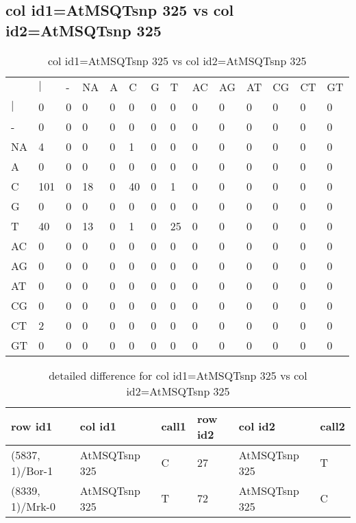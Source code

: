 \subsection{col id1=AtMSQTsnp 325 vs col id2=AtMSQTsnp 325}
\begin{center}
\begin{longtable}{|l|l|l|l|l|l|l|l|l|l|l|l|l|l|}
\caption{col id1=AtMSQTsnp 325 vs col id2=AtMSQTsnp 325} \label{table_dm666}\\
\hline
\\
\hline
&$|$&-&NA&A&C&G&T&AC&AG&AT&CG&CT&GT\\
$|$&0&0&0&0&0&0&0&0&0&0&0&0&0\\
-&0&0&0&0&0&0&0&0&0&0&0&0&0\\
NA&4&0&0&0&1&0&0&0&0&0&0&0&0\\
A&0&0&0&0&0&0&0&0&0&0&0&0&0\\
C&101&0&18&0&40&0&1&0&0&0&0&0&0\\
G&0&0&0&0&0&0&0&0&0&0&0&0&0\\
T&40&0&13&0&1&0&25&0&0&0&0&0&0\\
AC&0&0&0&0&0&0&0&0&0&0&0&0&0\\
AG&0&0&0&0&0&0&0&0&0&0&0&0&0\\
AT&0&0&0&0&0&0&0&0&0&0&0&0&0\\
CG&0&0&0&0&0&0&0&0&0&0&0&0&0\\
CT&2&0&0&0&0&0&0&0&0&0&0&0&0\\
GT&0&0&0&0&0&0&0&0&0&0&0&0&0\\
\hline
\end{longtable}
\end{center}

\begin{center}
\begin{longtable}{|l|l|l|l|l|l|}
\caption{detailed difference for col id1=AtMSQTsnp 325 vs col id2=AtMSQTsnp 325} \label{table_dm667}\\
\hline
row id1&col id1&call1&row id2&col id2&call2\\
\hline
(5837, 1)/Bor-1&AtMSQTsnp 325&C&27&AtMSQTsnp 325&T\\
(8339, 1)/Mrk-0&AtMSQTsnp 325&T&72&AtMSQTsnp 325&C\\
\hline
\end{longtable}
\end{center}

